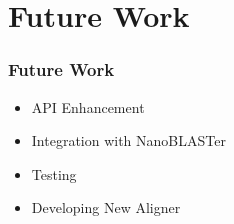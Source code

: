 \section{Future Work}

\begin{frame}
	\frametitle{Future Work}
	\begin{itemize}
		\item<1-> API Enhancement
		\item<2-> Integration with NanoBLASTer
		\item<3-> Testing
		\item<4-> Developing New Aligner
	\end{itemize}
\end{frame}